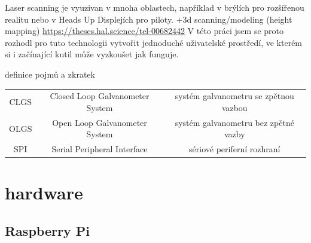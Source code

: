 \documentclass{template/socthesis}
\begin{document}
Laser scanning je vyuzivan v mnoha oblastech, například  v brýlích pro rozšířenou realitu nebo v Heads Up Displejích pro piloty. 
+3d scanning/modeling (height mapping) \url{https://theses.hal.science/tel-00682442}
V této  práci jsem se proto rozhodl pro tuto technologii vytvořit jednoduché uživatelské prostředí, ve kterém si i začínající kutil může vyzkoušet jak funguje.

\newpage

definice pojmů a zkratek
\begin{center}
  \begin{tabular}{c c c}
    CLGS & Closed Loop Galvanometer System & systém galvanometru se zpětnou vazbou \\
    OLGS & Open Loop Galvanometer System   & systém galvanometru bez zpětné vazby  \\
    SPI  & Serial Peripheral Interface     & sériové periferní rozhraní            \\
  \end{tabular}
\end{center}

\chapter{hardware}

\section{Raspberry Pi}
\end{document}
